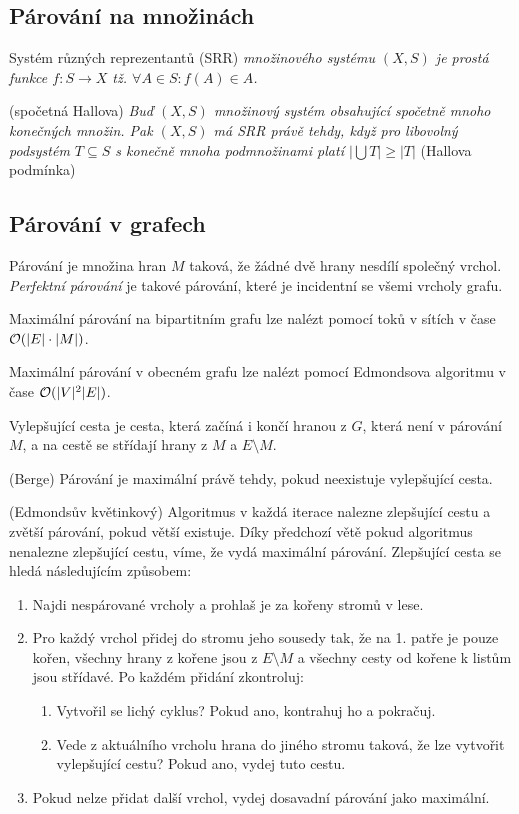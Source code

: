 \subsection{Párování na množinách}

\df Systém různých reprezentantů (SRR) {\it množinového systému $(X,S)$ je 
prostá funkce $f:S\rightarrow X$ tž. $\forall A \in S: f(A) \in A$.}

\vt (spočetná Hallova) {\it Buď $(X,S)$ množinový systém obsahující spočetně mnoho konečných množin. Pak $(X,S)$ má SRR právě tehdy, když pro libovolný podsystém $T \subseteq S$ s konečně mnoha podmnožinami platí $|\bigcup T| \ge |T|$} (Hallova podmínka)


\subsection{Párování v grafech}

\df Párování je množina hran $M$ taková, že žádné dvě hrany nesdílí společný 
vrchol. {\it Perfektní párování} je takové párování, které je incidentní se 
všemi vrcholy grafu.

\tv Maximální párování na bipartitním grafu lze nalézt pomocí toků v sítích v 
čase $\mathcal{O}(|E| \cdot |M|)$.

\vt Maximální párování v obecném grafu lze nalézt pomocí Edmondsova algoritmu v 
čase $\mathcal{O}(|V|^2|E|)$.

\df Vylepšující cesta je cesta, která začíná i končí hranou z $G$, která není v 
párování $M$, a na cestě se střídají hrany z $M$ a $E\setminus M$.

\vt (Berge) Párování je maximální právě tehdy, pokud neexistuje vylepšující 
cesta.

\alg (Edmondsův květinkový) Algoritmus v každá iterace nalezne zlepšující cestu 
a zvětší párování, pokud větší existuje. Díky předchozí větě pokud algoritmus 
nenalezne zlepšující cestu, víme, že vydá maximální párování. Zlepšující cesta 
se hledá následujícím způsobem:

\begin{enumerate}
	\item Najdi nespárované vrcholy a prohlaš je za kořeny stromů v lese.
	\item Pro každý vrchol přidej do stromu jeho sousedy tak, že na 1. patře je 
	pouze kořen, všechny hrany z kořene jsou z $E \setminus M$ a všechny cesty 
	od kořene k listům jsou střídavé. Po každém přidání zkontroluj:
	\begin{enumerate}
		\item Vytvořil se lichý cyklus? Pokud ano, kontrahuj ho a pokračuj.
		\item Vede z aktuálního vrcholu hrana do jiného stromu taková, že lze 
		vytvořit vylepšující cestu? Pokud ano, vydej tuto cestu.
	\end{enumerate}
	\item Pokud nelze přidat další vrchol, vydej dosavadní párování jako 
	maximální.
\end{enumerate}

